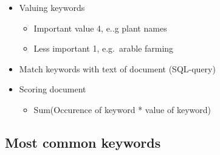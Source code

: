 \documentclass[
  letterpaper,
  DIV=11,
  numbers=noendperiod]{scrartcl}
\providecommand{\tightlist}{%
  \setlength{\itemsep}{0pt}\setlength{\parskip}{0pt}}\usepackage{longtable,booktabs,array}
\begin{document}
\begin{itemize}
\tightlist
\item
  Valuing keywords

  \begin{itemize}
  \tightlist
  \item
    Important value 4, e..g plant names
  \item
    Less important 1, e.g.~arable farming
  \end{itemize}
\item
  Match keywords with text of document (SQL-query)
\item
  Scoring document

  \begin{itemize}
  \tightlist
  \item
    Sum(Occurence of keyword * value of keyword)
  \end{itemize}
\end{itemize}

\hypertarget{most-common-keywords}{%
\subsection{Most common keywords}\label{most-common-keywords}}
\end{document}
